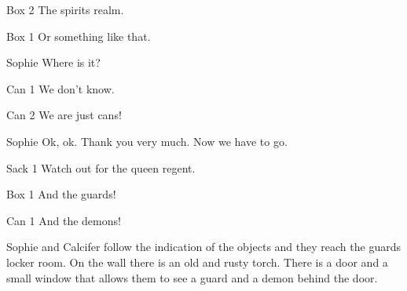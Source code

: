\begin{screenplay}
\begin{dialogue}{Box 2}
The spirits realm.
\end{dialogue}
\begin{dialogue}{Box 1}
Or something like that.
\end{dialogue}
\begin{dialogue}{Sophie}
Where is it?
\end{dialogue}
\begin{dialogue}{Can 1}
We don’t know.
\end{dialogue}
\begin{dialogue}{Can 2}
We are just cans!
\end{dialogue}
\begin{dialogue}{Sophie}
Ok, ok. Thank you very much. Now we have to go.
\end{dialogue}
\begin{dialogue}{Sack 1}
Watch out for the queen regent.
\end{dialogue}
\begin{dialogue}{Box 1}
And the guards!
\end{dialogue}
\begin{dialogue}{Can 1}
And the demons!
\end{dialogue}
\end{screenplay}
\vspace{1em}


Sophie and Calcifer follow the indication of the objects and they reach the guards locker room. On the wall there is an old and rusty torch. There is a door and a small window that allows them to see a guard and a demon behind the door.

